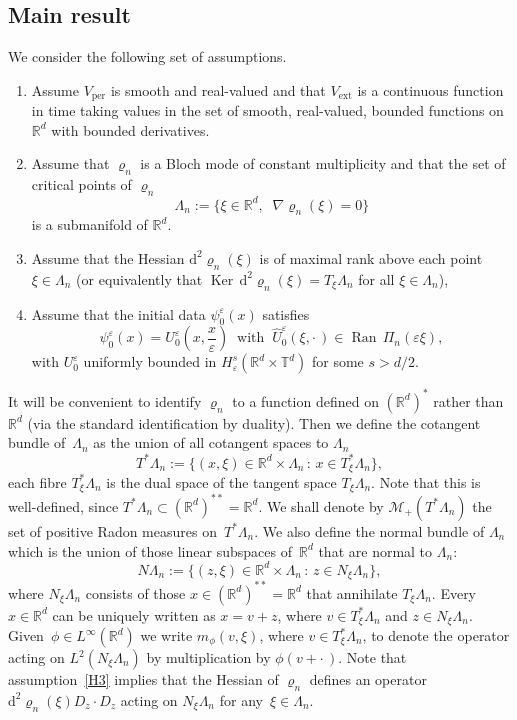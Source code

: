 \documentclass[AHL,Unicode,longabstracts]{cedram}
\DeclareMathOperator{\ext}{ext}
\DeclareMathOperator{\per}{per}
\DeclareMathOperator{\Ran}{Ran}
\DeclareMathOperator{\Ker}{Ker}
\newcommand*\R{{\mathbb R}}
\newcommand*\T{{\mathbb T}}
\newcommand*\eps{\varepsilon}
\numberwithin{equation}{section}
\newcommand*{\Henumi}{\renewcommand*{\theenumi}{{H\arabic{enumi}}}}
\newcommand*{\dd}{\mathrm{d}}
\begin{document}
\subsection{Main result}
We consider the following set of assumptions.

\begin{enumerate}\Henumi
\item \label{H1} Assume $V_{\per}$ is smooth and real-valued and that $V_{\ext}$ is a continuous function in time taking values in the set of smooth, real-valued, bounded functions on~$\R^d$ with bounded derivatives.
\item \label{H2}Assume that $\varrho_n$ is a Bloch mode of constant multiplicity and that the set of critical points of $\varrho_n$
\[
\Lambda_n:=\{\xi\in\R^d,\;\; \nabla \varrho_n(\xi)=0\}
\]
is a submanifold of $\R^d$.
\item \label{H3}Assume that the Hessian $\dd^2 \varrho_n(\xi)$ is of maximal rank above each point $\xi\in\Lambda_n$ (or equivalently that ${\Ker} \, \dd^2 \varrho_n(\xi)= T_\xi \Lambda_n$ for all $\xi\in\Lambda_n$),
\item \label{H4}Assume that the initial data $\psi^\eps_0(x)$ satisfies
\[
\psi^\eps_0(x)= U^\eps_0\left(x,\frac{x}{\eps}\right)\;\; \text{with} \;\; \widehat U^\eps_0(\xi, \cdot\,)\in {\Ran} \,\Pi_n(\eps \xi),
\]
with $U^\eps_0$ uniformly bounded in $H^s_\eps(\R^d\times\T^d)$ for some $s>d/2$.
\end{enumerate}


It will be convenient to identify $\varrho_n$ to a function defined on $(\R^d)^*$ rather than $\R^d$ (via the standard identification by duality). Then we define the cotangent bundle of~$\Lambda_n$ as the union of all cotangent spaces to $\Lambda_n$
\begin{equation}\label{def:T*X}
T^*\Lambda_n:=\{(x,\xi)\in \R^d\times \Lambda_n \, : \, x \in T_\xi^* \Lambda_n \},
\end{equation}
each fibre $T_\xi^*\Lambda_n$ is the dual space of the tangent space $T_\xi\Lambda_n$. Note that this is well-defined, since $T^*\Lambda_n\subset (\R^d)^{**}=\R^d$. We shall denote by $\mathcal{M}_+(T^*\Lambda_n)$ the set of positive Radon measures on~$T^*\Lambda_n$. We also define the normal bundle of $\Lambda_n$ which is the union of those linear subspaces of~$\R^d$ that are normal to $\Lambda_n$:
\begin{equation}\label{def:NX}
N\Lambda_n:=\{(z,\xi)\in \R^d\times \Lambda_n \, : \, z \in N_\xi \Lambda_n \},
\end{equation}
where $N_\xi \Lambda_n$ consists of those $x\in(\R^d)^{**}=\R^d$ that annihilate $T_\xi \Lambda_n$. Every~$x\in\R^d$ can be uniquely written as $x=v+z$, where $v\in T^*_\xi\Lambda_n$ and $z\in N_\xi\Lambda_n$. Given~$\phi\in L^\infty(\R^d)$ we write $m_\phi(v,\xi)$, where $v\in T^*_\xi\Lambda_n$, to denote the operator acting on $L^2(N_\xi\Lambda_n)$ by multiplication by $\phi(v+\cdot\,)$. Note that assumption~\eqref{H3} implies that the Hessian of $\varrho_n$ defines an operator $\dd^2\varrho_n(\xi)D_z\cdot D_z$ acting on $N_\xi\Lambda_n$ for any~$\xi\in\Lambda_n$.
\end{document}
